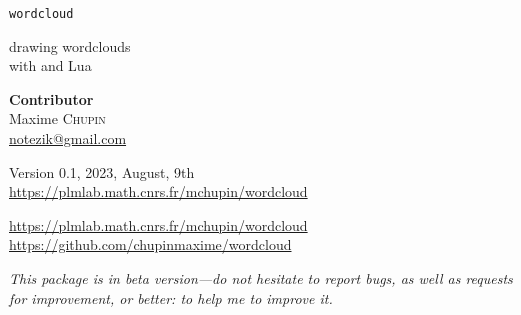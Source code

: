 \documentclass[english]{ltxdoc}
\begin{document}
\noindent
{\Huge \texttt{wordcloud}}\par\bigskip
\noindent
{\Large  drawing wordclouds \\[0.2cm]with  and Lua}\\[3cm]
\parbox{0.6\textwidth}{
}\hfill
\parbox{0.5\textwidth}{\Large\raggedleft
  \textbf{Contributor}\\
  Maxime \textsc{Chupin}\\
  \url{notezik@gmail.com}
}
\vfill
\begin{center}
  Version 0.1, 2023, August, 9th \\
  \url{https://plmlab.math.cnrs.fr/mchupin/wordcloud}
\end{center}
\newpage


\begin{abstract}
  These  and  packages allows to draw
  wordclouds from a list of words and weights. The algorithm is implemented with
   whereas Lua is used to parse \LaTeX{} commands, to build
  the list of words and weights from a text file, and to generate
   code interpreted by .
\end{abstract}


\begin{center}
  \url{https://plmlab.math.cnrs.fr/mchupin/wordcloud}
  \url{https://github.com/chupinmaxime/wordcloud}
\end{center}

\tableofcontents

\bigskip

\begin{tcolorbox}[ arc=0pt,outer arc=0pt,
  colback=darkred!3,
  colframe=darkred,
  breakable,
  boxsep=0pt,left=5pt,right=5pt,top=5pt,bottom=5pt, bottomtitle =
  3pt, toptitle=3pt,
  boxrule=0pt,bottomrule=0.5pt,toprule=0.5pt, toprule at break =
  0pt, bottomrule at break = 0pt,]
  \itshape
  This package is in beta version---do not hesitate to report bugs, as well as
  requests for improvement, or better: to help me to improve it. 
\end{tcolorbox}
\end{document}
